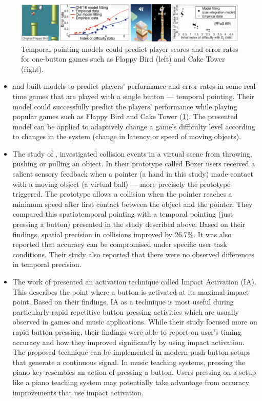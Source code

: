 \documentclass[manuscript,screen]{acmart}
\begin{document}
\begin{figure}[t]
\centering
 \includegraphics[width=12cm]{figures/flappybird.png}
    \caption{Temporal pointing models could predict player scores and error rates for one-button games such as Flappy Bird (left) and Cake Tower (right).
    }\label{fig:flappybird}
\end{figure}

\begin{itemize}
\item \citet{lee2016modelling} and \citet{lee2018moving} built models to predict players’ performance and error rates in some real-time games that are played with a single button — temporal pointing. Their model could successfully predict the players’ performance while playing popular games such as Flappy Bird and Cake Tower (\ref{fig:flappybird}). The presented model can be applied to adaptively change a game’s difficulty level according to changes in the system (change in latency or speed of moving objects). 
\item The study of \citet{lee2017boxer}, investigated collision events in a virtual scene from throwing, pushing or pulling an object.  In their prototype called Boxer users received a salient sensory feedback when a pointer (a hand in this study) made contact with a moving object (a virtual ball) — more precisely the prototype triggered. The prototype allows a collision when the pointer reaches a minimum speed after first contact between the object and the pointer. They compared this spatiotemporal pointing with a temporal pointing (just pressing a button) presented in the study described above. Based on their findings, spatial precision in collisions improved by 26.7\%. It was also reported that accuracy can be compromised under specific user task conditions. Their study also reported that there were no observed differences in temporal precision.
\item The work of \citet{kim2018impact} presented an activation technique called Impact Activation (IA). This describes the point where a button is activated at its maximal impact point. Based on their findings, IA as a technique is most useful during particularly-rapid repetitive button pressing activities which are usually observed in games and music applications. While their study focused more on rapid button pressing, their findings were able to report on user’s timing accuracy and how they improved significantly by using impact activation. The proposed technique can be implemented in modern push-button setups that generate a continuous signal. In music teaching systems, pressing the piano key resembles an action of pressing a button. Users pressing on a setup like a piano teaching system may potentially take advantage from accuracy improvements that use impact activation. 
\end{itemize}
\end{document}

